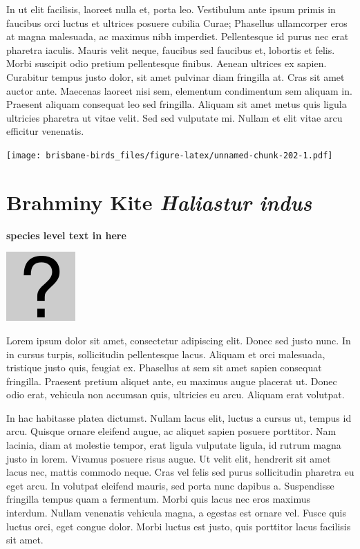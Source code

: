 \documentclass[]{book}
\let\origfigure\figure
\let\endorigfigure\endfigure
\renewenvironment{figure}[1][2] {
  \expandafter\origfigure\expandafter[H]
} {
  \endorigfigure
}
\begin{document}
In ut elit facilisis, laoreet nulla et, porta leo. Vestibulum ante ipsum
primis in faucibus orci luctus et ultrices posuere cubilia Curae;
Phasellus ullamcorper eros at magna malesuada, ac maximus nibh
imperdiet. Pellentesque id purus nec erat pharetra iaculis. Mauris velit
neque, faucibus sed faucibus et, lobortis et felis. Morbi suscipit odio
pretium pellentesque finibus. Aenean ultrices ex sapien. Curabitur
tempus justo dolor, sit amet pulvinar diam fringilla at. Cras sit amet
auctor ante. Maecenas laoreet nisi sem, elementum condimentum sem
aliquam in. Praesent aliquam consequat leo sed fringilla. Aliquam sit
amet metus quis ligula ultricies pharetra ut vitae velit. Sed sed
vulputate mi. Nullam et elit vitae arcu efficitur venenatis.

\begin{figure}
\centering
\texttt{[image: brisbane-birds\_files/figure-latex/unnamed-chunk-202-1.pdf]}
\caption{\label{fig:unnamed-chunk-202}insert figure caption}
\end{figure}

\section{\texorpdfstring{Brahminy Kite \emph{Haliastur
indus}}{Brahminy Kite Haliastur indus}}\label{brahminy-kite-haliastur-indus}

\textbf{species level text in here}

\begin{figure}
\centering
\includegraphics{assets/missing.png}
\caption{No image for species}
\end{figure}

Lorem ipsum dolor sit amet, consectetur adipiscing elit. Donec sed justo
nunc. In in cursus turpis, sollicitudin pellentesque lacus. Aliquam et
orci malesuada, tristique justo quis, feugiat ex. Phasellus at sem sit
amet sapien consequat fringilla. Praesent pretium aliquet ante, eu
maximus augue placerat ut. Donec odio erat, vehicula non accumsan quis,
ultricies eu arcu. Aliquam erat volutpat.

In hac habitasse platea dictumst. Nullam lacus elit, luctus a cursus ut,
tempus id arcu. Quisque ornare eleifend augue, ac aliquet sapien posuere
porttitor. Nam lacinia, diam at molestie tempor, erat ligula vulputate
ligula, id rutrum magna justo in lorem. Vivamus posuere risus augue. Ut
velit elit, hendrerit sit amet lacus nec, mattis commodo neque. Cras vel
felis sed purus sollicitudin pharetra eu eget arcu. In volutpat eleifend
mauris, sed porta nunc dapibus a. Suspendisse fringilla tempus quam a
fermentum. Morbi quis lacus nec eros maximus interdum. Nullam venenatis
vehicula magna, a egestas est ornare vel. Fusce quis luctus orci, eget
congue dolor. Morbi luctus est justo, quis porttitor lacus facilisis sit
amet.
\end{document}
